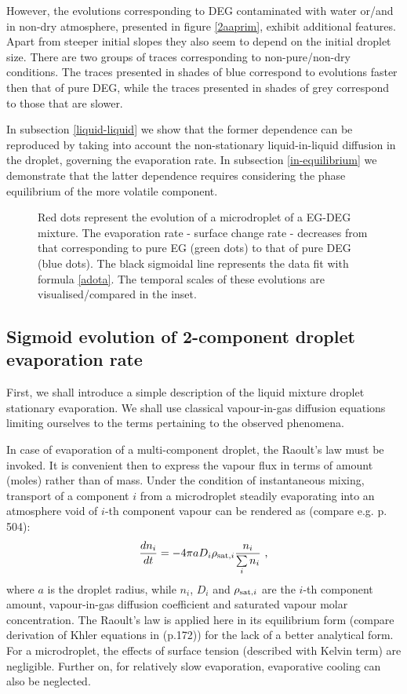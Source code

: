 \documentclass[twoside,twocolumn,9pt]{article}
\begin{document}
However, the evolutions corresponding to DEG contaminated with water or/and in non-dry atmosphere, presented in figure \ref{2aaprim}, exhibit additional features. Apart from steeper initial slopes they also seem to depend on the initial droplet size. There are two groups of traces corresponding to non-pure/non-dry conditions. The traces presented in shades of blue correspond to evolutions faster then that of pure DEG, while the traces presented in shades of grey correspond to those that are slower.

In subsection \ref{liquid-liquid} we show that the former dependence can be reproduced by taking into account the non-stationary liquid-in-liquid diffusion in the droplet, governing the evaporation rate. In subsection \ref{in-equilibrium} we demonstrate that the latter dependence requires considering the phase equilibrium of the more volatile component. 

\begin{figure}[htb]
 \centering
 \caption{Red dots represent the evolution of a microdroplet of a EG-DEG mixture. The evaporation rate - surface change rate - decreases from that corresponding to pure EG (green dots) to that of pure DEG (blue dots). The black sigmoidal line represents the data fit with formula \ref{adota}. The temporal scales of these evolutions are visualised/compared in the inset.}
 \label{2liquids}
\end{figure}

\subsection{Sigmoid evolution of 2-component droplet evaporation rate} \label{stationary->sigmoid}
First, we shall introduce a simple description of the liquid mixture droplet stationary evaporation. We shall use classical vapour-in-gas diffusion equations limiting ourselves to the terms pertaining to the observed phenomena.

In case of evaporation of a multi-component droplet, the Raoult's law must be invoked. It is convenient then to express the vapour flux in terms of amount (moles) rather than of mass. Under the condition of instantaneous mixing, transport of a component $i$ from a microdroplet steadily evaporating into an atmosphere void of $i$-th component vapour can be rendered as  (compare e.g. \cite{Pruppacher} p. 504):
\begin{equation}
  \frac{dn_i}{dt} = -4\pi a D_i\rho_{{\rm sat},i} \frac{n_i}{\sum\limits_{i} n_i} \mbox{~,}
  \label{i-th_component}
\end{equation}
where $a$ is the droplet radius, while $n_i$, $D_i$ and $\rho_{{\rm sat},i}$ are the $i$-th component amount, vapour-in-gas diffusion coefficient and saturated vapour molar concentration. The Raoult's law is applied here in its equilibrium form (compare derivation of Khler equations in \cite{Pruppacher} (p.172)) for the lack of a better analytical form. For a microdroplet, the effects of surface tension (described with Kelvin term) are negligible. Further on, for relatively slow evaporation, evaporative cooling can also be neglected.
\end{document}
